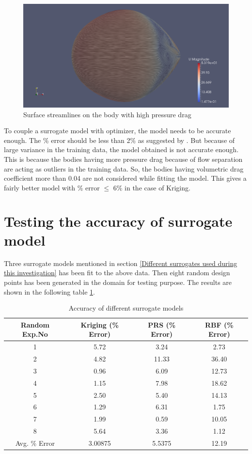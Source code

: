\begin{figure}[H]
	\centering
	\includegraphics[width=300 pt]{rnd/streamlines_45.png}
	\caption{Surface streamlines on the body with high pressure drag}
	\label{high drag body} %
\end{figure}

To couple a surrogate model with optimizer, the model needs to be accurate enough. The \% error should be less than 2\% as suggested by \cite{alam2017thesis}. But because of large variance in the training data, the model obtained is not accurate enough. This is because the bodies having more pressure drag because of flow separation are acting as outliers in the training data. So, the bodies having volumetric drag coefficient more than 0.04 are not considered while fitting the model. This gives a fairly better model with \% error $ \le $ 6\% in the case of Kriging.

 


\section{Testing the accuracy of surrogate model}

Three surrogate models mentioned in section \ref{Different surrogates used during this investigation} has been fit to the above data. Then eight random design points has been generated in the domain for testing purpose. The results are shown in the following table \ref{Accuracy of different surrogate models}.

\begin{table}[H]
	\caption{Accuracy of different surrogate models}
	\label{Accuracy of different surrogate models}
	\centering
	\begin{tabular}{cccc}
		\hline \hline
		Random Exp.No	&Kriging (\% Error)	&PRS (\% Error)	&RBF (\% Error) \\
		\hline \hline
		1 &5.72 &3.24	&2.73 \\
		2 &4.82	&11.33	&36.40 \\
		3 &0.96	&6.09	&12.73 \\
		4 &1.15	&7.98	&18.62 \\
		5 &2.50	&5.40	&14.13 \\
		6 &1.29	&6.31	&1.75 \\
		7 &1.99	&0.59	&10.05 \\
		8 &5.64	&3.36	&1.12 \\
		\hline \hline
		Avg. \% Error	& 3.00875	& 5.5375	& 12.19 \\
		\hline \hline
	\end{tabular}
\end{table}


